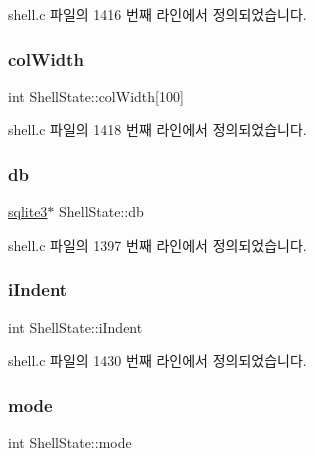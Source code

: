 shell.\+c 파일의 1416 번째 라인에서 정의되었습니다.

\mbox{\label{struct_shell_state_adf07d77efc02d83f1c42500ef6a4c433}} 
\subsubsection{\texorpdfstring{col\+Width}{colWidth}}
{\footnotesize\ttfamily int Shell\+State\+::col\+Width\mbox{[}100\mbox{]}}



shell.\+c 파일의 1418 번째 라인에서 정의되었습니다.

\mbox{\label{struct_shell_state_aff5184c68cc62f6db1876cc28ffaf7e0}} 
\subsubsection{\texorpdfstring{db}{db}}
{\footnotesize\ttfamily \hyperlink{sqlite3_8h_a0ef6f2646262c8a9b24368d8ac140f69}{sqlite3}$\ast$ Shell\+State\+::db}



shell.\+c 파일의 1397 번째 라인에서 정의되었습니다.

\mbox{\label{struct_shell_state_a08d5d59ae0d44497aca79e89a5b8f0fe}} 
\subsubsection{\texorpdfstring{i\+Indent}{iIndent}}
{\footnotesize\ttfamily int Shell\+State\+::i\+Indent}



shell.\+c 파일의 1430 번째 라인에서 정의되었습니다.

\mbox{\label{struct_shell_state_a555e4be1ff388f8fb4e71765e4b08ab2}} 
\subsubsection{\texorpdfstring{mode}{mode}}
{\footnotesize\ttfamily int Shell\+State\+::mode}



